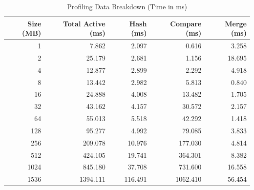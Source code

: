 \begin{table}[h]
  \centering
  \caption{Profiling Data Breakdown (Time in ms)}
  \label{tab:eviction-profile}
  \begin{tabular}{|r|r|r|r|r|}
    \hline
    \textbf{Size (MB)} & \textbf{Total Active (ms)} & \textbf{Hash (ms)} & \textbf{Compare (ms)} & \textbf{Merge (ms)} \\
    \hline
    1 & 7.862 & 2.097 & 0.616 & 3.258 \\
    \hline
    2 & 25.179 & 2.681 & 1.156 & 18.695 \\
    \hline
    4 & 12.877 & 2.899 & 2.292 & 4.918 \\
    \hline
    8 & 13.442 & 2.982 & 5.813 & 0.840 \\
    \hline
    16 & 24.888 & 4.008 & 13.482 & 1.705 \\
    \hline
    32 & 43.162 & 4.157 & 30.572 & 2.157 \\
    \hline
    64 & 55.013 & 5.518 & 42.292 & 1.418 \\
    \hline
    128 & 95.277 & 4.992 & 79.085 & 3.833 \\
    \hline
    256 & 209.078 & 10.976 & 177.030 & 4.814 \\
    \hline
    512 & 424.105 & 19.741 & 364.301 & 8.382 \\
    \hline
    1024 & 845.180 & 37.708 & 731.600 & 16.558 \\
    \hline
    1536 & 1394.111 & 116.491 & 1062.410 & 56.454 \\
    \hline
  \end{tabular}
\end{table}
